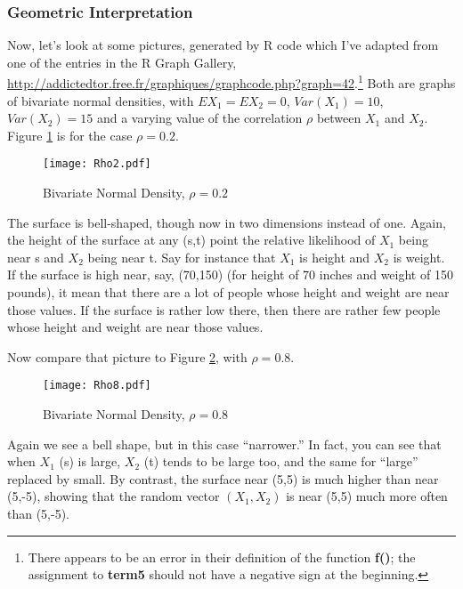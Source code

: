\subsubsection{Geometric Interpretation}

Now, let's look at some pictures, generated by R code which I've adapted
from one of the entries in the R Graph Gallery,
\url{http://addictedtor.free.fr/graphiques/graphcode.php?graph=42}.\footnote{There
appears to be an error in their definition of the function {\bf f()}; the
assignment to {\bf term5} should not have a negative sign at the
beginning.} Both are graphs of bivariate normal densities, with $EX_1 =
EX_2 = 0$, $Var(X_1) = 10$, $Var(X_2) = 15$ and a varying value of the
correlation $\rho$ between $X_1$ and $X_2$.  Figure \ref{rho2} is for
the case $\rho = 0.2$.


\begin{figure}
\centerline{
\texttt{[image: Rho2.pdf]}
}
\caption{Bivariate Normal Density, $\rho=0.2$}
\label{rho2}
\end{figure}

The surface is bell-shaped, though now in two dimensions instead of one.
Again, the height of the surface at any (s,t) point the relative
likelihood of $X_1$ being near s and $X_2$ being near t.  Say for
instance that $X_1$ is height and $X_2$ is weight.  If the surface is
high near, say, (70,150) (for height of 70 inches and weight of 150
pounds), it mean that there are a lot of people whose height and weight
are near those values.  If the surface is rather low there, then there
are rather few people whose height and weight are near those values.

Now compare that picture to Figure \ref{rho8}, with $\rho = 0.8$.

\begin{figure}
\centerline{
\texttt{[image: Rho8.pdf]}
}
\caption{Bivariate Normal Density, $\rho=0.8$}
\label{rho8}
\end{figure}

Again we see a bell shape, but in this case ``narrower.''  In fact, you
can see that when $X_1$ (s) is large, $X_2$ (t) tends to be large too,
and the same for ``large'' replaced by small.  By contrast, the surface
near (5,5) is much higher than near (5,-5), showing that the random
vector $(X_1, X_2)$ is near (5,5) much more often than (5,-5).

